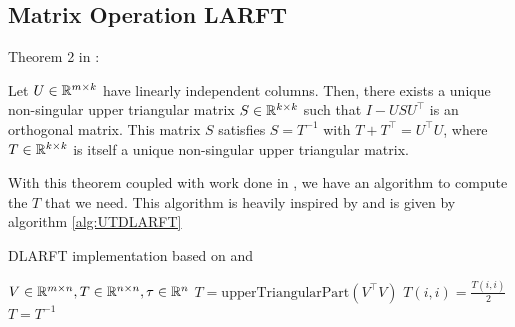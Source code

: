 \documentclass[12pt]{article}
\begin{document}
    \subsection{Matrix Operation LARFT}
    \begin{theorem}\label{thm:Puglisi}
        Theorem 2 in \cite{Joff}:

        Let $U\in\mathbb{R}^{m\times k}$ have linearly independent columns. Then, there exists
        a unique non-singular upper triangular matrix $S\in\mathbb{R}^{k\times k}$ such that
        $I-USU^\top$ is an orthogonal matrix. This matrix $S$ satisfies $S=T^{-1}$ with
        $T+T^\top = U^\top U$, where $T\in\mathbb{R}^{k\times k}$ is itself a unique non-singular upper 
        triangular matrix.
    \end{theorem}
    With this theorem coupled with work done in \cite{Puglisi}, we have an algorithm to compute the $T$ that 
    we need. This algorithm is heavily inspired by \cite{Joff} and is given by algorithm \ref{alg:UTDLARFT}

    \begin{algorithm}
        \caption{DLARFT implementation based on \cite{Joff} and \cite{Puglisi}}\label{alg:UTDLARFT}
        \begin{algorithmic}[1]
            \REQUIRE $V\in\mathbb{R}^{m\times n}, T\in\mathbb{R}^{n\times n}, \tau\in\mathbb{R}^n$\hfill{}
            \STATE $T = \text{upperTriangularPart}\left(V^\top V\right)$
                \STATE $T(i,i) = \frac{T(i,i)}{2}$
            \ENDFOR
            \STATE $T=T^{-1}$
        \end{algorithmic}
    \end{algorithm}
\end{document}
